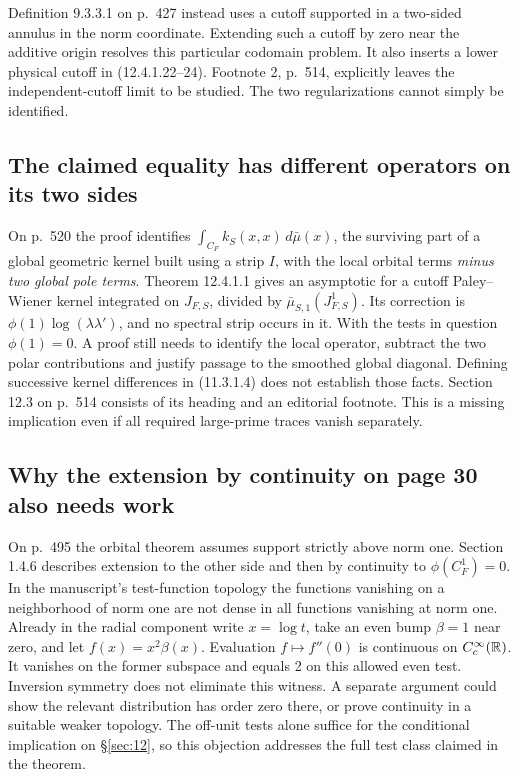 \documentclass[11pt,reqno]{amsart}
\numberwithin{equation}{section}
\begin{document}
Definition 9.3.3.1 on p.~427 instead uses a cutoff supported in a two-sided annulus in the norm coordinate. Extending such a cutoff by zero near the additive origin resolves this particular codomain problem. It also inserts a lower physical cutoff in (12.4.1.22--24). Footnote 2, p.~514, explicitly leaves the independent-cutoff limit to be studied. The two regularizations cannot simply be identified.

\subsection*{The claimed equality has different operators on its two sides}
On p.~520 the proof identifies \(\int_{C_F} k_S(x,x)\,d\bar\mu(x)\), the surviving part of a global geometric kernel built using a strip \(I\), with the local orbital terms \emph{minus two global pole terms}. Theorem 12.4.1.1 gives an asymptotic for a cutoff Paley--Wiener kernel integrated on \(J_{F,S}\), divided by \(\bar\mu_{S,1}(J_{F,S}^1)\). Its correction is \(\phi(1)\log(\lambda\lambda')\), and no spectral strip occurs in it. With the tests in question \(\phi(1)=0\). A proof still needs to identify the local operator, subtract the two polar contributions and justify passage to the smoothed global diagonal. Defining successive kernel differences in (11.3.1.4) does not establish those facts. Section 12.3 on p.~514 consists of its heading and an editorial footnote. This is a missing implication even if all required large-prime traces vanish separately.

\subsection*{Why the extension by continuity on page 30 also needs work}
On p.~495 the orbital theorem assumes support strictly above norm one. Section 1.4.6 describes extension to the other side and then by continuity to \(\phi(C_F^1)=0\). In the manuscript's test-function topology the functions vanishing on a neighborhood of norm one are not dense in all functions vanishing at norm one. Already in the radial component write \(x=\log t\), take an even bump \(\beta=1\) near zero, and let \(f(x)=x^2\beta(x)\). Evaluation \(f\mapsto f''(0)\) is continuous on \(C_c^\infty(\mathbb R)\). It vanishes on the former subspace and equals 2 on this allowed even test. Inversion symmetry does not eliminate this witness. A separate argument could show the relevant distribution has order zero there, or prove continuity in a suitable weaker topology. The off-unit tests alone suffice for the conditional implication on \S\ref{sec:12}, so this objection addresses the full test class claimed in the theorem.
\end{document}
